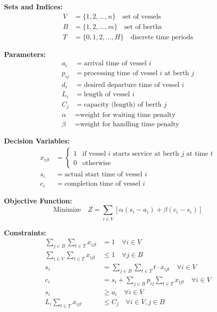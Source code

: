 \documentclass{article}
\begin{document}
\textbf{Sets and Indices:}
\begin{align}
V &= \{1, 2, \ldots, n\} \quad \text{set of vessels} \\
B &= \{1, 2, \ldots, m\} \quad \text{set of berths} \\
T &= \{0, 1, 2, \ldots, H\} \quad \text{discrete time periods}
\end{align}

\textbf{Parameters:}
\begin{align}
a_i &= \text{arrival time of vessel } i \\
p_{ij} &= \text{processing time of vessel } i \text{ at berth } j \\
d_i &= \text{desired departure time of vessel } i \\
L_i &= \text{length of vessel } i \\
C_j &= \text{capacity (length) of berth } j \\
\alpha &= \text{weight for waiting time penalty} \\
\beta &= \text{weight for handling time penalty}
\end{align}

\textbf{Decision Variables:}
\begin{align}
x_{ijt} &= \begin{cases} 
1 & \text{if vessel } i \text{ starts service at berth } j \text{ at time } t \\
0 & \text{otherwise}
\end{cases} \\
s_i &= \text{actual start time of vessel } i \\
c_i &= \text{completion time of vessel } i
\end{align}

\textbf{Objective Function:}
\begin{equation}
\text{Minimize} \quad Z = \sum_{i \in V} \left[\alpha(s_i - a_i) + \beta(c_i - s_i)\right]
\end{equation}

\textbf{Constraints:}
\begin{align}
\sum_{j \in B} \sum_{t \in T} x_{ijt} &= 1 \quad \forall i \in V \tag{Assignment} \\
\sum_{i \in V} \sum_{t \in T} x_{ijt} &\leq 1 \quad \forall j \in B \tag{Berth capacity} \\
s_i &= \sum_{j \in B} \sum_{t \in T} t \cdot x_{ijt} \quad \forall i \in V \tag{Start time} \\
c_i &= s_i + \sum_{j \in B} p_{ij} \sum_{t \in T} x_{ijt} \quad \forall i \in V \tag{Completion time} \\
s_i &\geq a_i \quad \forall i \in V \tag{Arrival constraint} \\
L_i \sum_{t \in T} x_{ijt} &\leq C_j \quad \forall i \in V, j \in B \tag{Length constraint}
\end{align}
\end{document}
